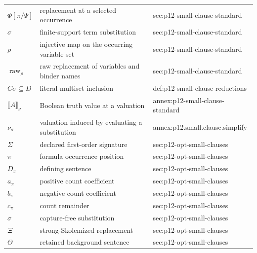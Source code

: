 \begin{longtable}{@{}p{}p{}p{}@{}}
\(\Phi[\pi/\Psi]\) & replacement at a selected occurrence & sec:\allowbreak{}p12-\allowbreak{}small-\allowbreak{}clause-\allowbreak{}standard \\
\(\sigma\) & finite-support term substitution & sec:\allowbreak{}p12-\allowbreak{}small-\allowbreak{}clause-\allowbreak{}standard \\
\(\rho\) & injective map on the occurring variable set & sec:\allowbreak{}p12-\allowbreak{}small-\allowbreak{}clause-\allowbreak{}standard \\
\(\operatorname{raw}_\rho\) & raw replacement of variables and binder names & sec:\allowbreak{}p12-\allowbreak{}small-\allowbreak{}clause-\allowbreak{}standard \\
\(C\sigma\subseteq D\) & literal-multiset inclusion & def:\allowbreak{}p12-\allowbreak{}small-\allowbreak{}clause-\allowbreak{}reductions \\
\(\llbracket A\rrbracket_\nu\) & Boolean truth value at a valuation & annex:\allowbreak{}p12-\allowbreak{}small-\allowbreak{}clause-\allowbreak{}standard \\
\(\nu_\sigma\) & valuation induced by evaluating a substitution & annex:\allowbreak{}p12.\allowbreak{}small.\allowbreak{}clause.\allowbreak{}simplify \\
\(\Sigma\) & declared first-order signature & sec:\allowbreak{}p12-\allowbreak{}opt-\allowbreak{}small-\allowbreak{}clauses \\
\(\pi\) & formula occurrence position & sec:\allowbreak{}p12-\allowbreak{}opt-\allowbreak{}small-\allowbreak{}clauses \\
\(D_\pi\) & defining sentence & sec:\allowbreak{}p12-\allowbreak{}opt-\allowbreak{}small-\allowbreak{}clauses \\
\(a_\pi\) & positive count coefficient & sec:\allowbreak{}p12-\allowbreak{}opt-\allowbreak{}small-\allowbreak{}clauses \\
\(b_\pi\) & negative count coefficient & sec:\allowbreak{}p12-\allowbreak{}opt-\allowbreak{}small-\allowbreak{}clauses \\
\(c_\pi\) & count remainder & sec:\allowbreak{}p12-\allowbreak{}opt-\allowbreak{}small-\allowbreak{}clauses \\
\(\sigma\) & capture-free substitution & sec:\allowbreak{}p12-\allowbreak{}opt-\allowbreak{}small-\allowbreak{}clauses \\
\(\Xi\) & strong-Skolemized replacement & sec:\allowbreak{}p12-\allowbreak{}opt-\allowbreak{}small-\allowbreak{}clauses \\
\(\Theta\) & retained background sentence & sec:\allowbreak{}p12-\allowbreak{}opt-\allowbreak{}small-\allowbreak{}clauses \\

\end{longtable}
